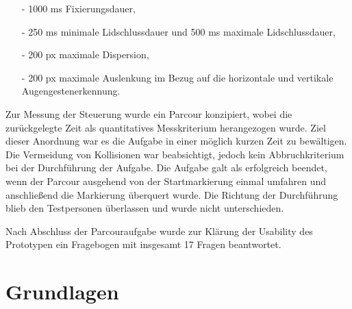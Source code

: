  \begin{itemize}[Standarteinstellungen]
 \item[-] 1000 ms Fixierungsdauer,
 \item[-] 250 ms minimale Lidschlussdauer und 500 ms maximale Lidschlussdauer,
 \item[-] 200 px maximale Dispersion,
 \item[-] 200 px maximale Auslenkung im Bezug auf die horizontale und vertikale Augengestenerkennung.
 \end{itemize}
 

Zur Messung der Steuerung wurde ein Parcour konzipiert, wobei die zurückgelegte Zeit als quantitatives Messkriterium herangezogen wurde. Ziel dieser Anordnung war es die Aufgabe in einer möglich kurzen Zeit zu bewältigen. Die Vermeidung von Kollisionen war beabsichtigt, jedoch kein Abbruchkriterium bei der Durchführung der Aufgabe. Die Aufgabe galt als erfolgreich beendet, wenn der Parcour ausgehend von der Startmarkierung einmal umfahren und anschließend die Markierung überquert wurde. Die Richtung der Durchführung blieb den Testpersonen überlassen und wurde nicht unterschieden.

Nach Abschluss der Parcouraufgabe wurde zur Klärung der Usability des Prototypen ein Fragebogen mit insgesamt 17 Fragen beantwortet. 











\chapter{Grundlagen}
\label{chapter:grundlagen}

